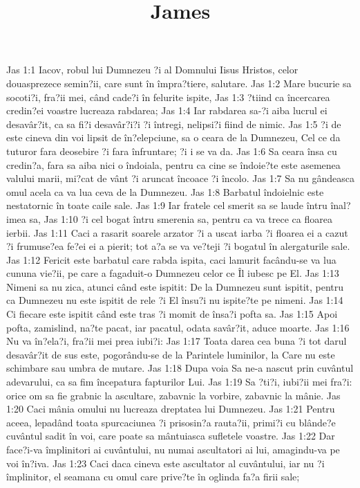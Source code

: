

\title{James}

Jas 1:1  Iacov, robul lui Dumnezeu ?i al Domnului Iisus Hristos, celor douasprezece semin?ii, care sunt în împra?tiere, salutare.
Jas 1:2  Mare bucurie sa socoti?i, fra?ii mei, când cade?i în felurite ispite,
Jas 1:3  ?tiind ca încercarea credin?ei voastre lucreaza rabdarea;
Jas 1:4  Iar rabdarea sa-?i aiba lucrul ei desavâr?it, ca sa fi?i desavâr?i?i ?i întregi, nelipsi?i fiind de nimic.
Jas 1:5  ?i de este cineva din voi lipsit de în?elepciune, sa o ceara de la Dumnezeu, Cel ce da tuturor fara deosebire ?i fara înfruntare; ?i i se va da.
Jas 1:6  Sa ceara însa cu credin?a, fara sa aiba nici o îndoiala, pentru ca cine se îndoie?te este asemenea valului marii, mi?cat de vânt ?i aruncat încoace ?i încolo.
Jas 1:7  Sa nu gândeasca omul acela ca va lua ceva de la Dumnezeu.
Jas 1:8  Barbatul îndoielnic este nestatornic în toate caile sale.
Jas 1:9  Iar fratele cel smerit sa se laude întru înal?imea sa,
Jas 1:10  ?i cel bogat întru smerenia sa, pentru ca va trece ca floarea ierbii.
Jas 1:11  Caci a rasarit soarele arzator ?i a uscat iarba ?i floarea ei a cazut ?i frumuse?ea fe?ei ei a pierit; tot a?a se va ve?teji ?i bogatul în alergaturile sale.
Jas 1:12  Fericit este barbatul care rabda ispita, caci lamurit facându-se va lua cununa vie?ii, pe care a fagaduit-o Dumnezeu celor ce Îl iubesc pe El.
Jas 1:13  Nimeni sa nu zica, atunci când este ispitit: De la Dumnezeu sunt ispitit, pentru ca Dumnezeu nu este ispitit de rele ?i El însu?i nu ispite?te pe nimeni.
Jas 1:14  Ci fiecare este ispitit când este tras ?i momit de însa?i pofta sa.
Jas 1:15  Apoi pofta, zamislind, na?te pacat, iar pacatul, odata savâr?it, aduce moarte.
Jas 1:16  Nu va în?ela?i, fra?ii mei prea iubi?i:
Jas 1:17  Toata darea cea buna ?i tot darul desavâr?it de sus este, pogorându-se de la Parintele luminilor, la Care nu este schimbare sau umbra de mutare.
Jas 1:18  Dupa voia Sa ne-a nascut prin cuvântul adevarului, ca sa fim începatura fapturilor Lui.
Jas 1:19  Sa ?ti?i, iubi?ii mei fra?i: orice om sa fie grabnic la ascultare, zabavnic la vorbire, zabavnic la mânie.
Jas 1:20  Caci mânia omului nu lucreaza dreptatea lui Dumnezeu.
Jas 1:21  Pentru aceea, lepadând toata spurcaciunea ?i prisosin?a rauta?ii, primi?i cu blânde?e cuvântul sadit în voi, care poate sa mântuiasca sufletele voastre.
Jas 1:22  Dar face?i-va împlinitori ai cuvântului, nu numai ascultatori ai lui, amagindu-va pe voi în?iva.
Jas 1:23  Caci daca cineva este ascultator al cuvântului, iar nu ?i împlinitor, el seamana cu omul care prive?te în oglinda fa?a firii sale;
